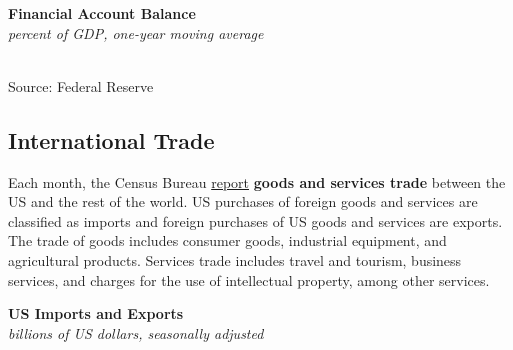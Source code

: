 \documentclass{report}
\makeatletter
\newcommand{\tbllink}[1]{\href{https://raw.githubusercontent.com/bdecon/US-chartbook/master/chartbook/data/#1}{\faTable}}
\newcommand*\short[1]{\expandafter\@gobbletwo\number\numexpr#1\relax}
\newcommand{\sbar}[4]{
		\addplot[ybar stacked, bar width=2.3pt, draw opacity=0, fill=#1] 
			table [x=#2, y=#3, col sep=comma]{#4};}
\newcommand{\absnode}[3]{\node[below right, align=left] at (axis cs: #1,#2) {#3};}
\newcommand{\dateaxisticks}{
		date coordinates in=x, axis line style={draw=none},
		xmax={2023-10-01},
		max space between ticks=40,	    
		xtick={{1990-01-01}, {1992-01-01}, {1994-01-01}, 
			{1996-01-01}, {1998-01-01}, {2000-01-01}, 
			{2002-01-01}, {2004-01-01}, {2006-01-01},
			{2008-01-01}, {2010-01-01}, {2012-01-01}, {2014-01-01},
		    {2016-01-01}, {2018-01-01}, {2020-01-01}, {2022-01-01}, 
		    {2024-01-01}, {2026-01-01}},
		minor xtick={{1989-01-01}, {1991-01-01}, {1993-01-01},
			{1995-01-01}, {1997-01-01}, {1999-01-01}, 
			{2001-01-01}, {2003-01-01}, {2005-01-01}, {2007-01-01},
		    {2009-01-01}, {2011-01-01}, {2013-01-01}, {2015-01-01},
		    {2017-01-01}, {2019-01-01}, {2021-01-01}, {2023-01-01}, 
		    {2025-01-01}, {2027-01-01}},
		enlarge y limits={0.06}, enlarge x limits={0.01},
		}
\newcommand{\ltdateaxisticks}{
		date coordinates in=x, axis line style={draw=none},
		xmax={2023-10-01},
		max space between ticks=40,	    
		xtick={{2013-01-01}, {2014-01-01}, {2015-01-01}, {2016-01-01}, {2017-01-01}, {2018-01-01}, 
		    {2019-01-01}, {2020-01-01}, {2021-01-01}, {2022-01-01}, {2023-01-01}, {2024-01-01}},
		enlarge y limits={0.06}, enlarge x limits={0.01},
		}
\newcommand{\bbar}[2]{extra #1 ticks = {{#2}}, extra #1 tick labels = ,
		extra #1 tick style = {grid=major, grid style={thick, black!25}},}
\newcommand{\stdline}[4]{\addplot[very thick, no markers, color=#1] 
		table [x=#2, y=#3, col sep=comma] {#4};	}
\newcommand{\rbars}{
		\fill[color=black!10] (axis cs:{1990-07-01},\pgfkeysvalueof{/pgfplots/ymin}) rectangle 
			(axis cs:{1991-03-01}, \pgfkeysvalueof{/pgfplots/ymax});
		\fill[color=black!10] (axis cs:{2007-12-01},\pgfkeysvalueof{/pgfplots/ymin}) rectangle 
			(axis cs:{2009-07-01}, \pgfkeysvalueof{/pgfplots/ymax});
		\fill[color=black!10] (axis cs:{2001-03-01},\pgfkeysvalueof{/pgfplots/ymin}) rectangle 
			(axis cs:{2001-11-01}, \pgfkeysvalueof{/pgfplots/ymax});
		\fill[color=black!10] (axis cs:{2020-02-01},\pgfkeysvalueof{/pgfplots/ymin}) rectangle 
			(axis cs:{2020-05-01}, \pgfkeysvalueof{/pgfplots/ymax});}
\newcommand{\rbar}{
		\fill[color=black!10] (axis cs:{2020-02-01},\pgfkeysvalueof{/pgfplots/ymin}) rectangle 
			(axis cs:{2020-05-01}, \pgfkeysvalueof{/pgfplots/ymax});}
\makeatother
\begin{document}
{\begin{minipage}{0.76\textwidth}
\normalsize \textbf{Financial Account Balance}\\
\footnotesize{\textit{percent of GDP, one-year moving average}}\\
\hspace*{-2mm} \\
\footnotesize{Source: Federal Reserve} \hfill \tbllink{fabz1.csv}
\end{minipage}
\newpage
\vspace*{-8mm}
\hypertarget{extt}{\label{extt}}
\begin{minipage}{0.76\textwidth}
\subsection*{International Trade}
\small Each month, the Census Bureau \href{https://www.census.gov/foreign-trade/Press-Release/current\_press\_release/index.html}{report} \textbf{goods and services trade} between the US and the rest of the world. US purchases of foreign goods and services are classified as imports and foreign purchases of US goods and services are exports. The trade of goods includes consumer goods, industrial equipment, and agricultural products. Services trade includes travel and tourism, business services, and charges for the use of intellectual property, among other services. 
\end{minipage}
\vspace*{-1mm}

\begin{minipage}{0.325\textwidth}
\normalsize \textbf{US Imports and Exports}\\
\footnotesize{\textit{billions of US dollars, seasonally adjusted}}\\
\hspace*{-3mm} 


\end{minipage}}
\end{document}
